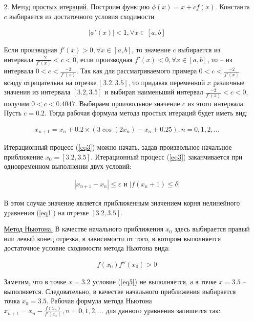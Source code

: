 \documentclass[utf8x, 14pt, oneside, a4paper]{article}
\begin{document}
2.  \underline{Метод простых итераций.}
	Построим функцию $\phi (x) = x + cf(x)$. Константа $c$ выбирается из
	достаточного условия сходимости

	\begin{align}\label{eq2}
	\left | \phi '(x) \right | < 1, \forall x \in [a, b]
	\end{align}

	Если производная $f '(x) > 0, \forall x \in [a, b]$, то значение $c$
	выбирается из интервала $\frac{-2}{f'(x)} < c < 0$, если производная $f '(x) <
	0, \forall x \in [a, b]$, то – из интервала $0 < c < \frac{-2}{f'(x)}$. Так как
	для рассматриваемого примера $0 < c < \frac{-2}{f'(x)}$ всюду отрицательна на
	отрезке $[3.2, 3.5]$, то придавая переменной $x$ различные значения из
	интервала $[3.2, 3.5]$ и выбирая наименьший интервал $\frac{-2}{f'(x)} < c <
	0$, получим $0 < c < 0.4047$. Выбираем произвольное значение $c$ из этого
	интервала. Пусть $c = 0.2$. Тогда рабочая формула метода простых итераций будет
	иметь вид:

	\begin{align}\label{eq3}
	x_{n+1} = x_n + 0.2 \times (3 \cos(2 x_n) - x_n + 0.25), n = 0, 1, 2, ...
	\end{align}

	Итерационный процесс (\ref{eq3}) можно начать, задав произвольное начальное
	приближение $x_0 = [3.2, 3.5]$. Итерационный процесс (\ref{eq3}) заканчивается
	при одновременном выполнении двух условий:

	\begin{align}\label{eq4}
	\left | x_{n+1} - x_n \right | \leq \varepsilon \text{ и } \left | f(x_n+1) \leq \delta \right |
	\end{align}

	В этом случае значение  является приближенным значением корня нелинейного
	уравнения (\ref{eq1}) на отрезке $[3.2, 3.5]$.

	\underline{Метод Ньютона.} В качестве начального приближения $x_0$ здесь выбирается
	правый или левый конец отрезка, в зависимости от того, в котором выполняется
	достаточное условие сходимости метода Ньютона вида:

	\begin{align}\label{eq5}
	f(x_0) f''(x_0) > 0
	\end{align}

	Заметим, что в точке $x = 3.2$ условие (\ref{eq5}) не выполняется, а в точке $x
	= 3.5$ -- выполняется. Следовательно, в качестве начального приближения
	выбирается точка $x_0 = 3.5$. Рабочая формула метода Ньютона
	$x_{n+1} = x_n - \frac{f(x_n)}{f'(x_n)}, n = 0, 1, 2, ...$ для данного
	уравнения запишется так:
\end{document}

